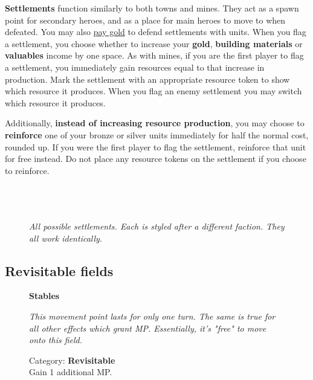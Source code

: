 \textbf{Settlements} function similarly to both towns and mines. They act as a spawn point for secondary heroes, and as a place for main heroes to move to when defeated. You may also \hyperlink{Town}{pay gold} to defend settlements with units. When you flag a settlement, you choose whether to increase your \textbf{gold}, \textbf{building materials} or \textbf{valuables} income by one space. As with mines, if you are the first player to flag a settlement, you immediately gain resources equal to that increase in production. Mark the settlement with an appropriate resource token to show which resource it produces. When you flag an enemy settlement you may switch which resource it produces.\par
Additionally, \textbf{instead of increasing resource production}, you may choose to \textbf{reinforce} one of your bronze or silver units immediately for half the normal cost, rounded up. If you were the first player to flag the settlement, reinforce that unit for free instead. Do not place any resource tokens on the settlement if you choose to reinforce.
\begin{figure}[h]
\centering
{}\hfill%
\hfill%
\\
\vspace{4pt}
\hfill%
\hfill%
\\
\vspace{4pt}
\\%
\vspace{4pt}
\textit{All possible settlements. Each is styled after a different faction. They all work identically.}
\end{figure}
\bigbreak

\subsection*{Revisitable fields}
\begin{figure}[h]
  \centering
  \captionsetup{width=.5\linewidth}
  \textbf{Stables}\par\medskip
  \caption{Category: \textbf{Revisitable}\\Gain 1 additional MP.}
  \bigbreak
  \textit{
    This movement point lasts for only one turn.
    The same is true for all other effects which grant MP.
    Essentially, it's "free" to move onto this field.
  }
\end{figure}

